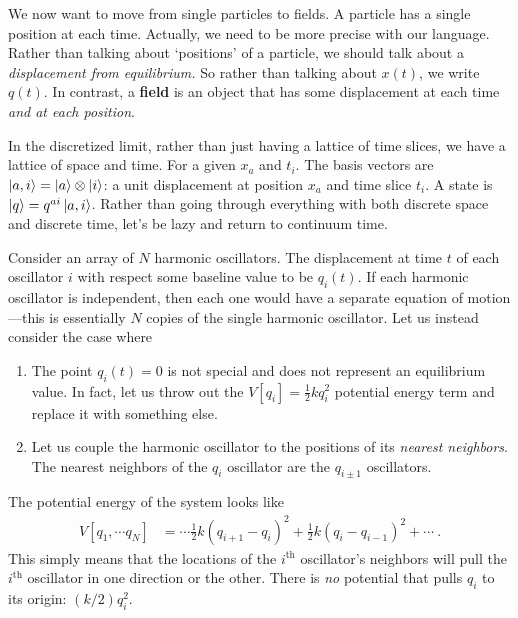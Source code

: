 We now want to move from single particles to fields. 
A particle has a single position at each time. Actually, we need to be more precise with our language. Rather than talking about `positions' of a particle, we should talk about a \emph{displacement from equilibrium.} So rather than talking about $x(t)$, we write $q(t)$. In contrast, a \textbf{field} is an object that has some displacement at each time \emph{and at each position}. 

In the discretized limit, rather than just having a lattice of time slices, we have a lattice of space and time. For a given $x_a$ and $t_i$. The basis vectors are $\left|a,i\right\rangle = \left|a\right\rangle\otimes \left|i\right\rangle$: a unit displacement at position $x_a$ and time slice $t_i$. A state is $\left|q\right\rangle = q^{ai}\left|a,i\right\rangle$. 
% 
Rather than going through everything with both discrete space and discrete time, let's be lazy and return to continuum time. 

Consider an array of $N$ harmonic oscillators. The displacement at time $t$ of each oscillator $i$ with respect some baseline value to be $q_i(t)$. If each harmonic oscillator is independent, then each one would have a separate equation of motion---this is essentially $N$ copies of the single harmonic oscillator. Let us instead consider the case where
\begin{enumerate}
    \item The point $q_i(t)=0$ is not special and does not represent an equilibrium value. In fact, let us throw out the $V[q_i]=\frac{1}{2}kq_i^2$ potential energy term and replace it with something else.
    \item Let us couple the harmonic oscillator to the positions of its \emph{nearest neighbors}. The nearest neighbors of the $q_i$ oscillator are the $q_{i\pm 1}$ oscillators. 
\end{enumerate}
The potential energy of the system looks like
\begin{align}
    V[q_1,\cdots q_N] &=
    \cdots
    \frac{1}{2}k(q_{i+1}-q_i)^2 +
    \frac{1}{2}k(q_{i}-q_{i-1})^2 +
    \cdots \ .
\end{align}
This simply means that the locations of the $i^\text{th}$ oscillator's neighbors will pull the $i^{\text{th}}$ oscillator in one direction or the other. There is \emph{no} potential that pulls $q_i$ to its origin: $(k/2)q_i^2$. 


